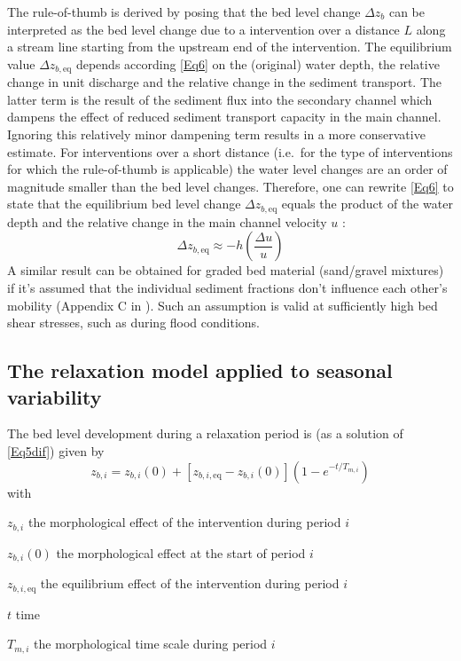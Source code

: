 The rule-of-thumb is derived by posing that the bed level change $\Delta z_b$ can be interpreted as the bed level change due to a intervention over a distance $L$ along a stream line starting from the upstream end of the intervention.
The equilibrium value $\Delta z_{b,\text{eq}}$ depends according \autoref{Eq6} on the (original) water depth, the relative change in unit discharge and the relative change in the sediment transport.
The latter term is the result of the sediment flux into the secondary channel which dampens the effect of reduced sediment transport capacity in the main channel.
Ignoring this relatively minor dampening term results in a more conservative estimate.
For interventions over a short distance (i.e.~for the type of interventions for which the rule-of-thumb is applicable) the water level changes are an order of magnitude smaller than the bed level changes.
Therefore, one can rewrite \autoref{Eq6} to state that the equilibrium bed level change $\Delta z_{b,\text{eq}}$ equals the product of the water depth and the relative change in the main channel velocity $u$ :
%
\begin{equation}
\Delta z_{b,\text{eq}} \approx -h \left ( \frac{\Delta u}{u} \right )
\label{Eq6v2}
\end{equation}
%
A similar result can be obtained for graded bed material (sand/gravel mixtures) if it's assumed that the individual sediment fractions don't influence each other's mobility (Appendix C in \citet{Waterdienst2008}).
Such an assumption is valid at sufficiently high bed shear stresses, such as during flood conditions.

\subsection{The relaxation model applied to seasonal variability}

The bed level development during a relaxation period is (as a solution of \autoref{Eq5dif}) given by
%
\begin{equation}
z_{b,i} = z_{b,i} (0) + [z_{b,i,\text{eq}} - z_{b,i}(0)](1 - e^{-t/T_{m,i}})
\label{Eq7}
\end{equation}
%
with
%
\begin{symbollist}
\item[$z_{b,i}$]  the morphological effect of the intervention during period $i$
\item[$z_{b,i}(0)$]  the morphological effect at the start of period $i$
\item[$z_{b,i,\text{eq}}$]  the equilibrium effect of the intervention during period $i$
\item[$t$]  time
\item[$T_{m,i}$]  the morphological time scale during period $i$
\end{symbollist}

